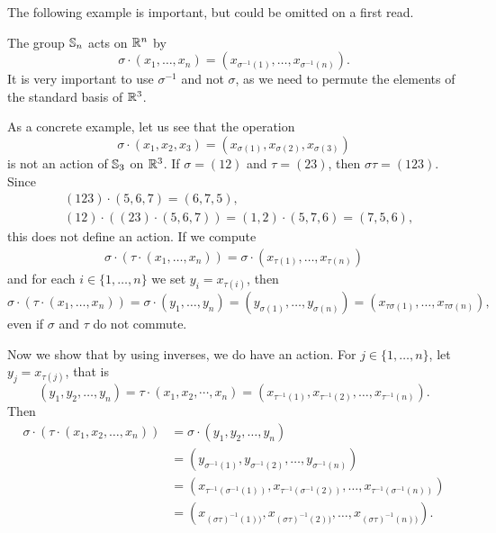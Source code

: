 The following example is important, but could be omitted on a first read.

\begin{optional}  
\begin{example}
    The group $\mathbb{S}_n$ acts on $\mathbb{R}^n$ by
    \[
    \sigma\cdot (x_1,\dots,x_n)=(x_{\sigma^{-1}(1)},\dots,x_{\sigma^{-1}(n)}).
    \]
    It is very important to use $\sigma^{-1}$ and not 
    $\sigma$, as we need to permute the elements of the standard basis of $\mathbb{R}^3$.

    As a concrete example, let us see that the operation 
    \[
    \sigma\cdot (x_1,x_2,x_3)=(x_{\sigma(1)},x_{\sigma(2)},x_{\sigma(3)})
    \]
    is not an action of $\mathbb{S}_3$ on $\mathbb{R}^3$.
    If $\sigma=(12)$ and $\tau=(23)$, then $\sigma\tau=(123)$. Since 
    \begin{align*}
    &(123)\cdot (5,6,7)=(6,7,5),\\
    &(12)\cdot ((23)\cdot (5,6,7))=(1,2)\cdot (5,7,6)=(7,5,6),
    \end{align*}
    this does not define an action. If we compute 
    \begin{align*}
        \sigma\cdot (\tau\cdot (x_1,\dots,x_n))
        =\sigma\cdot (x_{\tau(1)},\dots,x_{\tau(n)})
    \end{align*}
    and for each $i\in\{1,\dots,n\}$ we set $y_i=x_{\tau(i)}$, then 
    \[
    \sigma\cdot (\tau\cdot (x_1,\dots,x_n))=\sigma\cdot (y_1,\dots,y_n)=(y_{\sigma(1)},\dots,y_{\sigma(n)})
    =(x_{\tau\sigma(1)},\dots,x_{\tau\sigma(n)}),
    \]
    even if $\sigma$ and $\tau$ do not commute.

    Now we show that by using inverses, we do have an action. 
    For $j\in\{1,\dots,n\}$, let $y_j=x_{\tau(j)}$,
    that is 
    \[
    (y_1,y_2,\dots,y_n)=\tau\cdot (x_1,x_2,\cdots,x_n)=(x_{\tau^{-1}(1)},x_{\tau^{-1}(2)},\dots,x_{\tau^{-1}(n)}).
    \]
    Then 
    \begin{align*}
        \sigma\cdot (\tau\cdot (x_1,x_2,\dots,x_n))&=\sigma\cdot (y_1,y_2,\dots,y_n)\\
        &=\left(y_{\sigma^{-1}(1)},y_{\sigma^{-1}(2)},\dots,y_{\sigma^{-1}(n)}\right)\\
        &=\left(x_{\tau^{-1}(\sigma^{-1}(1))},x_{\tau^{-1}(\sigma^{-1}(2))},\dots,x_{\tau^{-1}(\sigma
^{-1}(n))}\right)\\
        &=\left(x_{(\sigma\tau)^{-1}(1))},x_{(\sigma\tau)^{-1}(2))},\dots,x_{(\sigma\tau)^{-1}(n))}\right).
    \end{align*}
\end{example}
\end{optional}

